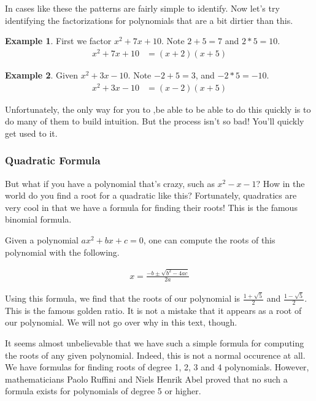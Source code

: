 \documentclass{scrbook}
\theoremstyle{definition}
\newtheorem{example}{Example}
\begin{document}
In cases like these the patterns are fairly simple to identify. Now let's try identifying the factorizations for polynomials that are a bit dirtier than this.

\begin{example}
  First we factor $x^2 + 7x + 10$. Note $2 + 5 = 7$ and $2 * 5 = 10$. 
  \begin{align*}
    x^2 + 7x + 10 &= (x + 2)(x + 5)
  \end{align*}
\end{example}

\begin{example}
  Given $x^2 + 3x - 10$. Note $-2 + 5 = 3$, and $-2 * 5 = -10$. 
  \begin{align*}
    x^2 + 3x - 10 &= (x - 2)(x + 5)
  \end{align*}
\end{example}

Unfortunately, the only way for you to ,be able to be able to do this quickly is to do many of them to build intuition. But the process isn't so bad! You'll quickly get used to it.

\subsubsection{Quadratic Formula}

But what if you have a polynomial that's crazy, such as $x^2 - x - 1$? How in the world do you find a root for a quadratic like this? Fortunately, quadratics are very cool in that we have a formula for finding their roots! This is the famous binomial formula.

Given a polynomial $ax^2 + bx + c = 0$, one can compute the roots of this polynomial with the following.

\begin{align*}
  x = \frac{-b \pm \sqrt{b^2 - 4ac}}{2a}
\end{align*}

Using this formula, we find that the roots of our polynomial is $\frac{1 + \sqrt{5}}{2}$ and $\frac{1 - \sqrt{5}}{2}$. This is the famous golden ratio. It is not a mistake that it appears as a root of our polynomial. We will not go over why in this text, though. 

It seems almost unbelievable that we have such a simple formula for computing the roots of any given polynomial. Indeed, this is not a normal occurence at all. We have formulas for finding roots of degree 1, 2, 3 and 4 polynomials. However, mathematicians Paolo Ruffini and Niels Henrik Abel proved that no such a formula exists for polynomials of degree 5 or higher.
\end{document}
